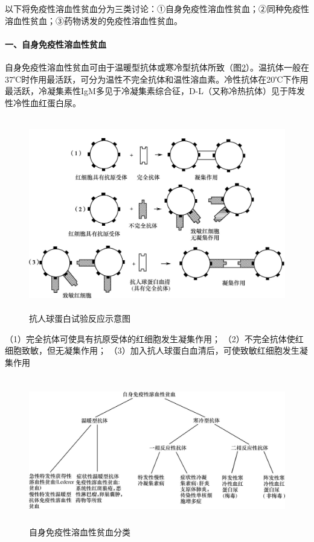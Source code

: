 以下将免疫性溶血性贫血分为三类讨论：①自身免疫性溶血性贫血；②同种免疫性溶血性贫血；③药物诱发的免疫性溶血性贫血。

\paragraph{一、自身免疫性溶血性贫血}

自身免疫性溶血性贫血可由于温暖型抗体或寒冷型抗体所致（图\ref{fig33-5}）。温抗体一般在37℃时作用最活跃，可分为温性不完全抗体和温性溶血素。冷性抗体在20℃下作用最活跃，冷凝集素性IgM多见于冷凝集素综合征，D-L（又称冷热抗体）见于阵发性冷性血红蛋白尿。

\begin{figure}[!htbp]
 \centering
 \includegraphics[width=5.09375in,height=3.32292in]{./images/Image00178.jpg}
 \captionsetup{justification=centering}
 \caption{抗人球蛋白试验反应示意图}
 \label{fig33-4}
  \end{figure} 

（1）完全抗体可使具有抗原受体的红细胞发生凝集作用；
（2）不完全抗体使红细胞致敏，但无凝集作用；
（3）加入抗人球蛋白血清后，可使致敏红细胞发生凝集作用

\begin{figure}[!htbp]
 \centering
 \includegraphics[width=5.5625in,height=2.53125in]{./images/Image00179.jpg}
 \captionsetup{justification=centering}
 \caption{自身免疫性溶血性贫血分类}
 \label{fig33-5}
  \end{figure} 

